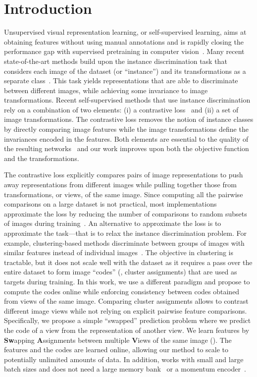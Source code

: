
\section{Introduction}

Unsupervised visual representation learning, or self-supervised learning, aims at obtaining features without using manual annotations and is rapidly closing the performance gap with supervised pretraining in computer vision~\cite{chen2020simple,he2019momentum,misra2019self}.
Many recent state-of-the-art methods build upon the instance discrimination task that considers each image of the dataset (or ``instance'') and its transformations as a separate class~\cite{dosovitskiy2016discriminative}. 
This task yields representations that are able to discriminate between different images, while achieving some invariance to image transformations. 
Recent self-supervised methods that use instance discrimination rely on a combination of two elements: (i) a contrastive loss~\cite{hadsell2006dimensionality} and (ii) a set of image transformations. 
The contrastive loss removes the notion of instance classes by directly comparing image features while the image transformations define the invariances encoded in the features.
Both elements are essential to the quality of the resulting networks~\cite{misra2019self,chen2020simple} and our work improves upon both the objective function and the transformations.

The contrastive loss explicitly compares pairs of image representations to push away representations from different images while pulling together those from transformations, or views, of the same image.
Since computing all the pairwise comparisons on a large dataset is not practical, most implementations approximate the loss by reducing the number of comparisons to random subsets of images during training~\cite{chen2020simple,he2019momentum,wu2018unsupervised}.
An alternative to approximate the loss is to approximate the task---that is to relax the instance discrimination problem.
For example, clustering-based methods discriminate between groups of images with similar features instead of individual images~\cite{caron2018deep}. 
The objective in clustering is tractable, but it does not scale well with the dataset as it requires a pass over the entire dataset to form image ``codes'' (\ie, cluster assignments) that are used as targets during training.
In this work, we use a different paradigm and propose to compute the codes online while enforcing consistency between codes obtained from views of the same image.
Comparing cluster assignments allows to contrast different image views while not relying on explicit pairwise feature comparisons.
Specifically, we propose a simple ``swapped'' prediction problem where we predict the code of a view from the representation of another view.
We learn features by \textbf{Sw}apping \textbf{A}ssignments between multiple \textbf{V}iews of the same image (\textbf{\OURS}).
The features and the codes are learned online, allowing our method to scale to potentially unlimited amounts of data.
In addition, \OURS works with small and large batch sizes and does not need a large memory bank~\cite{wu2018unsupervised} or a momentum encoder~\cite{he2019momentum}.

